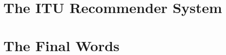 \documentclass[10pt, oneside]{report}
\begin{document}
\chapter{The ITU Recommender System}
\label{chap:chapter3}




%

\chapter{The Final Words}
\label{chap:the_final_words}




\end{document}

